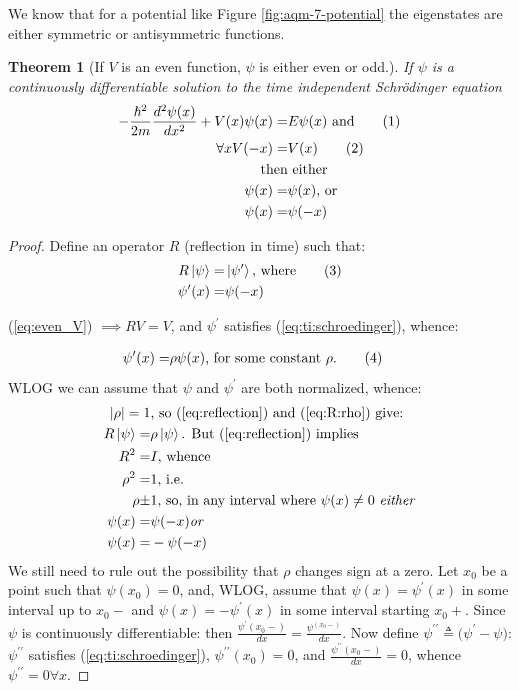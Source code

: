 \documentclass[]{article}
\newcommand\numberthis{\addtocounter{equation}{1}\tag{\theequation}}
\newtheorem{thm}{Theorem}
\begin{document}
We know that for a potential like Figure \ref{fig:aqm-7-potential} the eigenstates are either symmetric or antisymmetric functions.

\begin{thm}[If $V$ is an even function, $\psi$ is either even or odd.]
	If  $\psi$  is a continuously differentiable solution to the time independent Schr\"odinger equation
	\begin{align*}
	-\frac{\hslash^2}{2m}\frac{d^2 \psi(x)}{d x^2} + V(x)\psi(x) =& E\psi(x) \text{ and}\numberthis \label{eq:ti:schroedinger}\\
	\forall x V(-x) =& V(x) \numberthis \label{eq:even_V}\\
	\text{then}&\text{ either}\\
	\psi(x) =& \psi(x)\text{, or}\\
	\psi(x) =& \psi(-x)
	\end{align*}
\end{thm}

\begin{proof}
	Define an operator $R$ (reflection in time) such that:
	\begin{align*}
		R \ket{\psi} =& \ket{\psi^{\prime}} \text{, where} \numberthis \label{eq:reflection}\\
		\psi^{\prime}(x) =& \psi(-x)
	\end{align*}
	
	(\ref{eq:even_V}) $\implies RV=V$, and $\psi^{\prime}$ satisfies (\ref{eq:ti:schroedinger}), whence:
	
	\begin{align*}
	\psi^{\prime}(x) =& \rho \psi(x) \text{, for some constant $\rho$.} \numberthis \label{eq:R:rho}
	\end{align*}
	WLOG we can assume that $\psi$ and $\psi^{\prime}$ are both normalized, whence:
	\begin{align*}
		\lvert \rho \rvert = 1& \text{, so (\ref{eq:reflection}) and (\ref{eq:R:rho}) give:}\\
		R \ket{\psi} =& \rho \ket{\psi} \text{. But (\ref{eq:reflection}) implies}\\
		R^2    =& I \text{, whence}\\
		\rho^2 =& 1 \text{, i.e.}\\
		\rho \pm& 1 \text{, so, in any interval where $\psi(x)\ne 0$ \emph{either}}\\
		\psi(x) =& \psi(-x) \text{\emph{or}}\\
		\psi(x) =& -\psi(-x)
	\end{align*}
	We still need to rule out the possibility that $\rho$ changes sign at a zero. Let $x_0$ be a point such that $\psi(x_0)=0$, and, WLOG, assume that $\psi(x)=\psi^{\prime}(x)$ in some interval up to $x_0-$ and $\psi(x)=-\psi^{\prime}(x)$ in some interval starting $x_0+$. Since $\psi$ is continuously differentiable: then $\frac{\psi^{\prime}(x_0-)}{dx}=\frac{\psi^(x_0-)}{dx}$. Now define $\psi^{\prime\prime} \triangleq \big(\psi^{\prime}-\psi\big)$: $\psi^{\prime\prime}$ satisfies (\ref{eq:ti:schroedinger}), $\psi^{\prime\prime}(x_0)=0$, and $\frac{\psi^{\prime\prime}(x_0-)}{dx}=0$, whence $\psi^{\prime\prime}=0 \forall x$. 
\end{proof}
\end{document}
